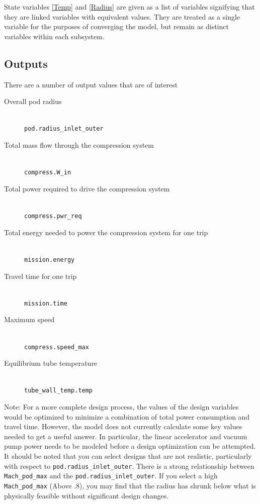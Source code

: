 \documentclass[heading.tex]{subfiles}
\begin{document}
State variables \ref{Temp} and \ref{Radius} are given as a list of variables signifying that they are linked variables with equivalent values. They are
treated as a single variable for the purposes of converging the model, but remain as distinct variables within each subsystem.

\subsection{Outputs}
There are a number of output values that are of interest

\begin{description}
  \item[Overall pod radius] \hfill \\
  \texttt{pod.radius\_inlet\_outer}
  \item[Total mass flow through the compression system] \hfill \\
  \texttt{compress.W\_in}
  \item[Total power required to drive the compression system] \hfill \\
  \texttt{compress.pwr\_req}
  \item[Total energy needed to power the compression system for one trip] \hfill \\
  \texttt{mission.energy}
  \item[Travel time for one trip] \hfill \\
  \texttt{mission.time}
  \item[Maximum speed] \hfill \\
  \texttt{compress.speed\_max}
  \item[Equilibrium tube temperature] \hfill \\
  \texttt{tube\_wall\_temp.temp}
\end{description}

Note: For a more complete design process, the values of the design variables would be optimized to minimize a combination of total power
consumption and travel time. However, the model does not currently calculate some key values needed to get a useful answer. In particular,
the linear accelerator and vacuum pump power needs to be modeled before a design optimization can be attempted.
It should be noted that you can select designs that are not realistic, particularly with respect to \texttt{pod.radius\_inlet\_outer}. There is
a strong relationship between \texttt{Mach\_pod\_max} and the \texttt{pod.radius\_inlet\_outer}. If you select a high 
\texttt{Mach\_pod\_max} (Above .8), you may find that the radius has shrunk below what is physically feasible without significant design
changes.
\end{document}
